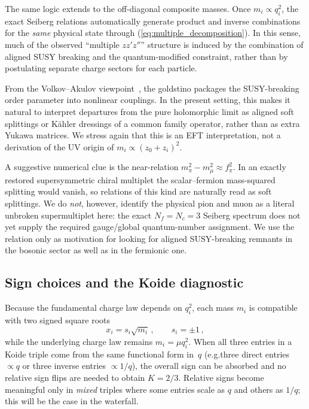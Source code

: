 \documentclass[11pt,a4paper]{article}
\makeatletter
\newcommand{\Nf}{N_f}
\newcommand{\Nc}{N_c}
\newcommand{\eg}{e.g.\@}
\makeatother
\begin{document}
The same logic extends to the off-diagonal composite masses.  Once
$m_i\propto q_i^2$, the exact Seiberg relations automatically generate
product and inverse combinations for the \emph{same} physical state through
(\ref{eq:multiple_decomposition}).  In this sense, much of the observed
``multiple $zz'z''$'' structure is induced by the combination of aligned
SUSY breaking and the quantum-modified constraint, rather than by postulating
separate charge sectors for each particle.

From the Volkov--Akulov viewpoint~\cite{VolkovAkulov:1973}, the goldstino
packages the SUSY-breaking order parameter into nonlinear couplings.  In the
present setting, this makes it natural to interpret departures from the pure
holomorphic limit as aligned soft splittings or K\"ahler dressings of a common
family operator, rather than as extra Yukawa matrices.  We stress again that
this is an EFT interpretation, not a derivation of the UV origin of
$m_i\propto(z_0+z_i)^2$.

A suggestive numerical clue is the near-relation
$m_\pi^2-m_\mu^2\approx f_\pi^2$.  In an exactly restored supersymmetric
chiral multiplet the scalar--fermion mass-squared splitting would vanish, so
relations of this kind are naturally read as soft splittings.  We do
\emph{not}, however, identify the physical pion and muon as a literal
unbroken supermultiplet here: the exact $\Nf=\Nc=3$ Seiberg spectrum does not
yet supply the required gauge/global quantum-number assignment.  We use the
relation only as motivation for looking for aligned SUSY-breaking remnants in
the bosonic sector as well as in the fermionic one.

\subsection{Sign choices and the Koide diagnostic}
\label{sec:signs}

Because the fundamental charge law depends on $q_i^2$, each mass $m_i$
is compatible with two signed square roots
\begin{equation}
  x_i=s_i\sqrt{m_i}\,,
  \qquad
  s_i=\pm1\,,
  \label{eq:signed_roots}
\end{equation}
while the underlying charge law remains $m_i=\mu q_i^2$.
When all three entries in a Koide triple come from the same functional form
in~$q$ (\eg three direct entries $\propto q$ or three inverse entries
$\propto 1/q$), the overall sign can be absorbed and no relative sign flips
are needed to obtain $K=2/3$.
Relative signs become meaningful only in \emph{mixed} triples where some
entries scale as $q$ and others as $1/q$; this will be the case in the
waterfall.
\end{document}
